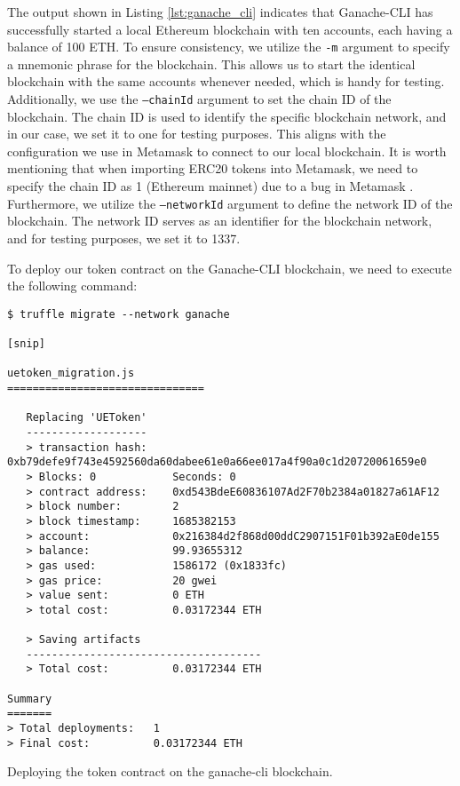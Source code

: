 The output shown in Listing \ref{lst:ganache_cli} indicates that Ganache-CLI has successfully started a local Ethereum blockchain with ten accounts, each having a balance of 100 ETH. To ensure consistency, we utilize the \texttt{-m} argument to specify a mnemonic phrase for the blockchain. This allows us to start the identical blockchain with the same accounts whenever needed, which is handy for testing.
Additionally, we use the \texttt{--chainId} argument to set the chain ID of the blockchain. The chain ID is used to identify the specific blockchain network, and in our case, we set it to one for testing purposes. This aligns with the configuration we use in Metamask \cite{metamask} to connect to our local blockchain. It is worth mentioning that when importing ERC20 tokens into Metamask, we need to specify the chain ID as 1 (Ethereum mainnet) due to a bug in Metamask \cite{metamask_bug_importerc20}.
Furthermore, we utilize the \texttt{--networkId} argument to define the network ID of the blockchain. The network ID serves as an identifier for the blockchain network, and for testing purposes, we set it to 1337.

To deploy our token contract on the Ganache-CLI blockchain, we need to execute the following command:

\begin{listing}[H]
    \begin{verbatim}
$ truffle migrate --network ganache

[snip]

uetoken_migration.js
===============================

   Replacing 'UEToken'
   -------------------
   > transaction hash:    0xb79defe9f743e4592560da60dabee61e0a66ee017a4f90a0c1d20720061659e0
   > Blocks: 0            Seconds: 0
   > contract address:    0xd543BdeE60836107Ad2F70b2384a01827a61AF12
   > block number:        2
   > block timestamp:     1685382153
   > account:             0x216384d2f868d00ddC2907151F01b392aE0de155
   > balance:             99.93655312
   > gas used:            1586172 (0x1833fc)
   > gas price:           20 gwei
   > value sent:          0 ETH
   > total cost:          0.03172344 ETH

   > Saving artifacts
   -------------------------------------
   > Total cost:          0.03172344 ETH

Summary
=======
> Total deployments:   1
> Final cost:          0.03172344 ETH
    \end{verbatim}
    \caption{Deploying the token contract on the ganache-cli blockchain.}
    \label{lst:truffle_migrate}
\end{listing}


